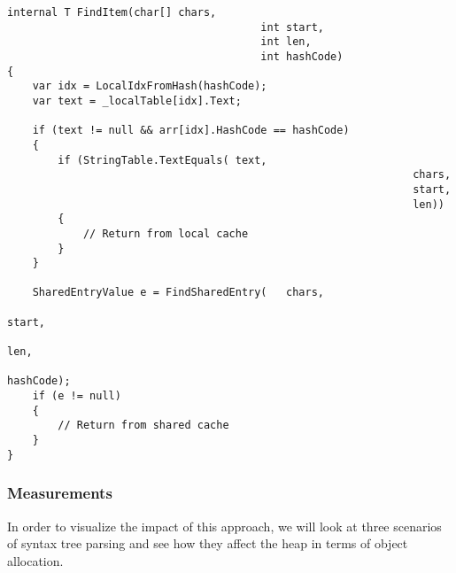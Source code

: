 \begin{lstlisting}
internal T FindItem(char[] chars, 
										int start, 
										int len, 
										int hashCode)
{
	var idx = LocalIdxFromHash(hashCode);
	var text = _localTable[idx].Text;

	if (text != null && arr[idx].HashCode == hashCode)
	{
		if (StringTable.TextEquals(	text, 
																chars, 
																start, 
																len))
		{
			// Return from local cache
		}
	}

	SharedEntryValue e = FindSharedEntry(	chars, 
																				start, 
																				len, 
																				hashCode);
	if (e != null)
	{
		// Return from shared cache
	}
}
\end{lstlisting}

\subsubsection{Measurements}
\label{sec:re-use-measurements}

In order to visualize the impact of this approach, we will look at three scenarios of syntax tree parsing and see how they affect the heap in terms of object allocation.

